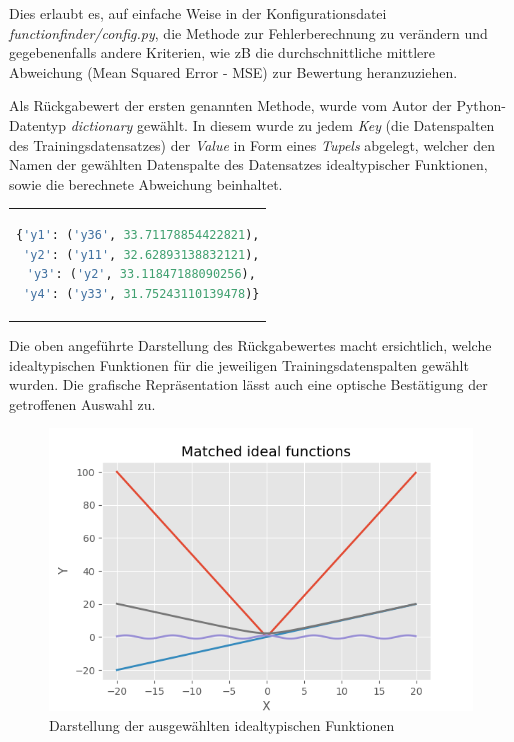 Dies erlaubt es, auf einfache Weise in der Konfigurationsdatei \emph{functionfinder/config.py}, die Methode zur Fehlerberechnung zu verändern und gegebenenfalls andere Kriterien, wie zB die durchschnittliche mittlere Abweichung (Mean Squared Error - MSE) zur Bewertung heranzuziehen. 

Als Rückgabewert der ersten genannten Methode, wurde vom Autor der Python-Datentyp \emph{dictionary} gewählt. In diesem wurde zu jedem \emph{Key} (die Datenspalten des Trainingsdatensatzes) der \emph{Value} in Form eines \emph{Tupels} abgelegt, welcher den Namen der gewählten Datenspalte des Datensatzes idealtypischer Funktionen, sowie die berechnete Abweichung beinhaltet.

\begin{tabular}{c}  %
\begin{lstlisting}[language=python,
				   caption={Darstellung des Rückgabewertes der berechneten Übereinstimmungen},
				   label=dictresult]
{'y1': ('y36', 33.71178854422821),
 'y2': ('y11', 32.62893138832121),
 'y3': ('y2', 33.11847188090256),
 'y4': ('y33', 31.75243110139478)}
\end{lstlisting}
\end{tabular}

Die oben angeführte Darstellung des Rückgabewertes macht ersichtlich, welche idealtypischen Funktionen für die jeweiligen Trainingsdatenspalten gewählt wurden. Die grafische Repräsentation lässt auch eine optische Bestätigung der getroffenen Auswahl zu.

\begin{figure}[h]
\centering
\includegraphics[width=13cm]{../output/figures/ideal.png}
\caption{Darstellung der ausgewählten idealtypischen Funktionen \cite{Gage:18}}
\label{fig:ideal}
\end{figure}

